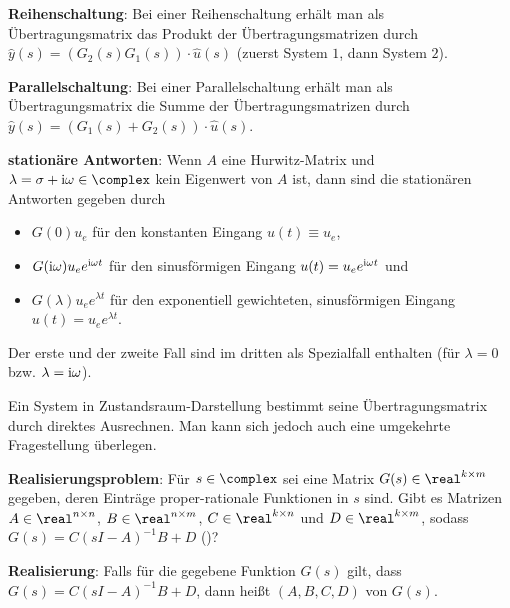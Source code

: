 \textbf{Reihenschaltung}:
Bei einer Reihenschaltung erhält man als Übertragungsmatrix das Produkt der
Übertragungsmatrizen durch
$\widehat{y}(s) = (G_2(s) G_1(s)) \cdot \widehat{u}(s)$
(zuerst System $1$, dann System $2$).

\textbf{Parallelschaltung}:
Bei einer Parallelschaltung erhält man als Übertragungsmatrix die Summe der
Übertragungsmatrizen durch
$\widehat{y}(s) = (G_1(s) + G_2(s)) \cdot \widehat{u}(s)$.

\textbf{stationäre Antworten}:
Wenn $A$ eine Hurwitz-Matrix und $\lambda = \sigma + \iu \omega \in \complex$
kein Eigenwert von $A$ ist, dann sind die stationären Antworten gegeben durch
\begin{itemize}
    \item
    $G(0) u_e$ für den konstanten Eingang $u(t) \equiv u_e$,
    
    \item
    $G(\text{i}\omega) u_e e^{\text{i}\omega t}$ für den sinusförmigen Eingang
    $u(t) = u_e e^{\text{i}\omega t}$ und
    
    \item
    $G(\lambda) u_e e^{\lambda t}$ für den exponentiell gewichteten, sinusförmigen Eingang
    $u(t) = u_e e^{\lambda t}$.
\end{itemize}
Der erste und der zweite Fall sind im dritten als Spezialfall enthalten
(für $\lambda = 0$ bzw. $\lambda = \text{i}\omega$).

\linie

Ein System in Zustandsraum-Darstellung bestimmt seine Übertragungsmatrix durch direktes Ausrechnen.
Man kann sich jedoch auch eine umgekehrte Fragestellung überlegen.

\textbf{Realisierungsproblem}:
Für $s \in \complex$ sei eine Matrix $G(s) \in \real^{k \times m}$ gegeben,
deren Einträge proper-rationale Funktionen in $s$ sind.
Gibt es Matrizen $A \in \real^{n \times n}$, $B \in \real^{n \times m}$,
$C \in \real^{k \times n}$ und $D \in \real^{k \times m}$, sodass
$G(s) = C(sI - A)^{-1} B + D$
()?

\textbf{Realisierung}:
Falls für die gegebene Funktion $G(s)$ gilt,
dass $G(s) = C(sI - A)^{-1} B + D$, dann heißt $(A, B, C, D)$
 von $G(s)$.

